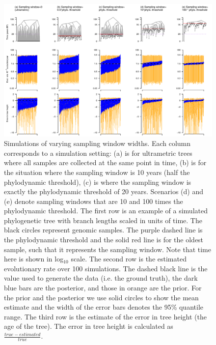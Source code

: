 \documentclass[11pt]{article}
\begin{document}
\begin{landscape}
	\begin{figure}[H]
		\begin{center}
			\includegraphics[scale=0.7, angle=0]{summary_all_estimates_correct_prior.pdf}
			\caption{Simulations of varying sampling window widths. Each column corresponds to a simulation setting: (a) is for ultrametric trees where all samples are collected at the same point in time, (b) is for the situation where the sampling window is 10 years (half the phylodynamic threshold), (c) is where the sampling window is exactly the phylodynamic threshold of 20 years. Scenarios (d) and (e) denote sampling windows that are 10 and 100 times the phylodynamic threshold. The first row is an example of a simulated phylogenetic tree with branch lengths scaled in units of time. The black circles represent genomic samples. The purple dashed line is the phylodynamic threshold and the solid red line is for the oldest sample, such that it represents the sampling window. Note that time here is shown in log$_{10}$ scale. The second row is the estimated evolutionary rate over 100 simulations. The dashed black line is the value used to generate the data (i.e. the ground truth), the dark blue bars are the posterior, and those in orange are the prior. For the prior and the posterior we use solid circles to show the mean estimate and the width of the error bars denotes the 95\% quantile range. The third row is the estimate of the error in tree height (the age of the tree). The error in tree height is calculated as $\frac{true-estimated}{true}$.}
			\label{figure:Fig2}
		\end{center}
	\end{figure}
\end{landscape}
\end{document}
